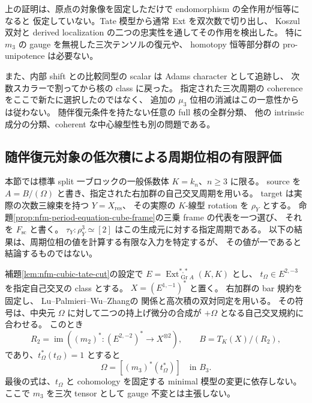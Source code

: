 \begin{remark}[復元の忠実性と残る範囲]
上の証明は、原点の対象像を固定しただけで endomorphism の全作用が恒等になると
仮定していない。Tate 模型から通常 Ext を双次数で切り出し、
Koszul 双対と derived localization の二つの忠実性を通してその作用を検出した。
特に $m_3$ の gauge を無視した三次テンソルの復元や、
homotopy 恒等部分群の pro-unipotence は必要ない。

また、内部 shift との比較同型の scalar は Adams character として追跡し、
次数スカラーで割ってから核の class に戻った。
指定された三次周期の coherence をここで新たに選択したのではなく、
追加の $\mu_3$ 位相の消滅はこの一意性からは従わない。
随伴復元条件を持たない任意の full 核の全群分類、
他の intrinsic 成分の分類、coherent な中心線型性も別の問題である。
\end{remark}

\subsection{随伴復元対象の低次積による周期位相の有限評価}

本節では標準 split 一ブロックの一般係数体 $K=k_n$、$n\ge3$ に限る。
source を $A=B/(\Omega)$ と書き、指定された右加群の自己交叉周期を用いる。
target は実際の次数三線束を持つ $Y=X_{\mathrm{res}}$、
その実際の $K$-線型 rotation を $\rho_Y$ とする。
命題\ref{prop:nfm-period-equation-cube-frame}の三乗 frame の代表を一つ選び、
それを $F_{\mathrm{sc}}$ と書く。
$\tau_Y:\rho_Y^3\simeq[2]$ はこの生成元に対する指定周期である。
以下の結果は、周期位相の値を計算する有限な入力を特定するが、
その値が一であると結論するものではない。

\begin{lemma}
\label{lem:nfm-tate-cubic-relation-normalization}
補題\ref{lem:nfm-cubic-tate-cut}の設定で
$E=\operatorname{Ext}_{\operatorname{Gr}A}^{*,*}(K,K)$ とし、
$t_\Omega\in E^{2,-3}$ を指定自己交叉の class とする。
$X=(E^{1,-1})^*$ と置く。
右加群の bar 規約を固定し、
Lu--Palmieri--Wu--Zhang\cite[Corollary~B]{NFMLPWZExt}の
関係と高次積の双対同定を用いる。
その符号は、中央元 $\Omega$ に対して二つの持上げ微分の合成が
$+\Omega$ となる自己交叉規約に合わせる。
このとき
\[
 R_2=\operatorname{im}\left(
       (m_2)^*:(E^{2,-2})^*\longrightarrow X^{\otimes2}\right),
 \qquad B=T_K(X)/(R_2),
\]
であり、$t_\Omega^*(t_\Omega)=1$ とすると
\[
 \Omega=\left[(m_3)^*(t_\Omega^*)\right]\quad\text{in }B_3.
\]
最後の式は、$t_\Omega$ と cohomology を固定する minimal 模型の変更に依存しない。
ここで $m_3$ を三次 tensor として gauge 不変とは主張しない。
\end{lemma}

